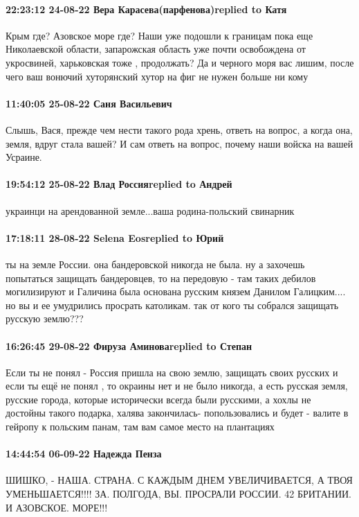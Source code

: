 \paragraph{22:23:12 24-08-22 Вера Карасева(парфенова)replied to Катя}

Крым где? Азовское море где? Наши уже подошли к границам пока еще Николаевской
области, запарожская область уже почти освобождена от укросвиней, харьковская
тоже , продолжать? Да и черного моря вас лишим, после чего ваш вонючий
хуторянский хутор на фиг не нужен больше ни кому

\paragraph{11:40:05 25-08-22 Саня Васильевич}

Слышь, Вася, прежде чем нести такого рода хрень, ответь на вопрос, а когда она,
земля, вдруг стала вашей? И сам ответь на вопрос, почему наши войска на вашей
Усраине.

\paragraph{19:54:12 25-08-22 Влад Россияreplied to Андрей}

украинци на арендованной земле...ваша родина-польский свинарник

\paragraph{17:18:11 28-08-22 Selena Eosreplied to Юрий}

ты на земле России. она бандеровской никогда не была. ну а захочешь попытаться защищать бандеровцев, то на передовую - там таких дебилов могилизируют   
и Галичина была основана русским князем  Данилом Галицким....  но вы и ее умудрились просрать католикам.
так от кого ты собрался защищать русскую землю???

\paragraph{16:26:45 29-08-22 Фируза Аминоваreplied to Степан}

Если ты не понял - Россия пришла на свою землю, защищать своих русских и если
ты ещё не понял , то окраины нет и не было никогда, а есть русская земля,
русские города, которые исторически всегда были русскими, а хохлы не достойны
такого подарка, халява закончилась- попользовались и будет - валите в гейропу к
польским панам, там вам самое место на плантациях

\paragraph{14:44:54 06-09-22 Надежда Пенза}

ШИШКО, - НАША. СТРАНА. С КАЖДЫМ ДНЕМ УВЕЛИЧИВАЕТСЯ, А ТВОЯ
УМЕНЬШАЕТСЯ!!!!
ЗА. ПОЛГОДА, ВЫ. ПРОСРАЛИ
РОССИИ. 42 %
БРИТАНИИ. И
АЗОВСКОЕ. МОРЕ!!!


